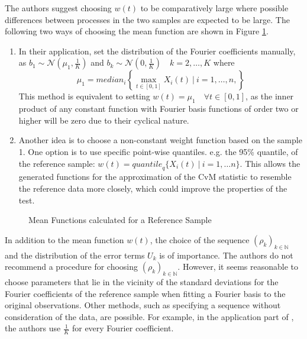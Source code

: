 \documentclass[12pt, a4paper]{article}
\theoremstyle{MAstyle} \newtheorem{assumption}{Assumption}[section]
\theoremstyle{MAstyle} \newtheorem{definition}{Definition}[section]
\theoremstyle{MAstyle} \newtheorem{theorem}{Theorem}[section]
\begin{document}
			The authors suggest choosing $w(t)$ to be comparatively large where possible differences between processes in the two samples are expected to be large. The following two ways of choosing the mean function are shown in Figure \ref{mean_functions}.
			
			\begin{enumerate}
				\item In their application, \cite{bugni_permutation_2021} set the distribution of the Fourier coefficients manually, as $b_1 \sim \mathcal{N}(\mu_1, \frac{1}{K})$ and $b_k \sim \mathcal{N}(0, \frac{1}{K}) \quad k = 2, \dots, K$ where 
				$$\mu_1 = \textit{median}_i \left\{\max_{t\in [0,1]} X_i(t) \ | \ i = 1, \dots, n, \right\}$$
				This method is equivalent to setting $w(t) = \mu_1 \quad \forall t \in [0,1]$, as the inner product of any constant function with Fourier basis functions of order two or higher will be zero due to their cyclical nature.
				\item Another idea is to choose a non-constant weight function based on the sample 1. One option is to use specific point-wise quantiles. e.g. the 95\% quantile, of the reference sample: $w(t) = \textit{quantile}_q \{X_i(t) \ | \ i = 1, \dots n\}$. This allows the generated functions for the approximation of the CvM statistic to resemble the reference data more closely, which could improve the properties of the test.
			\end{enumerate}
		
			\begin{figure}[H]
				\caption{Mean Functions calculated for a Reference Sample}
				\label{mean_functions}
			\end{figure}
			
			In addition to the mean function $w(t)$, the choice of the sequence $(\rho_k)_{k \in \mathbb{N}}$ and the distribution of the error terms $U_k$ is of importance.			
			The authors do not recommend a procedure for choosing $(\rho_k)_{k \in \mathbb{N}}$. However, it seems reasonable to choose parameters that lie in the vicinity of the standard deviations for the Fourier coefficients of the reference sample when fitting a Fourier basis to the original observations. Other methods, such as specifying a sequence without consideration of the data, are possible. For example, in the application part of \cite{bugni_permutation_2021}, the authors use $\frac{1}{K}$ for every Fourier coefficient. 
			
\end{document}
